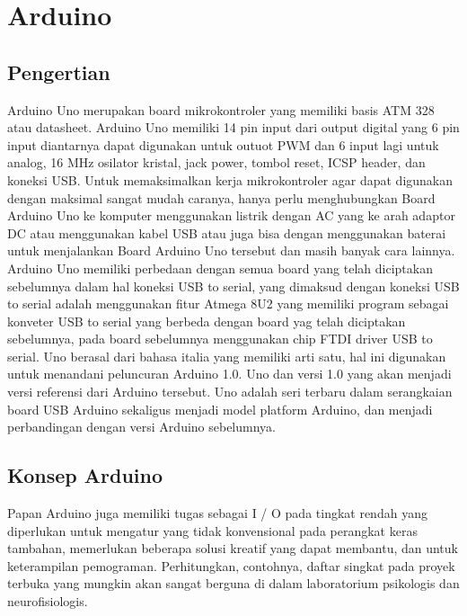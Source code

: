 \section{Arduino}
\subsection{Pengertian}
Arduino Uno merupakan board mikrokontroler yang memiliki basis ATM 328 atau datasheet. Arduino Uno memiliki 14 pin input dari output digital yang 6 pin input diantarnya dapat digunakan untuk outuot PWM dan 6 input lagi untuk analog, 16 MHz osilator kristal, jack power, tombol reset, ICSP header, dan koneksi USB. Untuk memaksimalkan kerja mikrokontroler agar dapat digunakan dengan maksimal sangat mudah caranya, hanya perlu menghubungkan Board Arduino Uno ke komputer menggunakan listrik dengan  AC yang ke arah  adaptor DC atau menggunakan kabel USB atau  juga bisa dengan menggunakan baterai untuk menjalankan Board Arduino Uno tersebut dan masih banyak cara lainnya.
Arduino Uno memiliki perbedaan dengan semua board yang telah diciptakan sebelumnya dalam hal koneksi USB to serial, yang dimaksud dengan koneksi USB to serial adalah menggunakan fitur Atmega 8U2 yang memiliki program sebagai konveter USB to serial yang berbeda dengan board yag telah diciptakan sebelumnya, pada board sebelumnya menggunakan chip FTDI driver USB to serial.
Uno berasal dari bahasa italia yang memiliki arti satu, hal ini digunakan untuk menandani peluncuran Arduino 1.0. Uno dan versi 1.0 yang akan menjadi versi referensi dari Arduino tersebut. Uno adalah seri terbaru dalam serangkaian board USB Arduino sekaligus menjadi model platform Arduino, dan menjadi perbandingan dengan versi Arduino sebelumnya.
\subsection{Konsep Arduino}
Papan Arduino juga memiliki tugas sebagai I / O pada tingkat rendah yang diperlukan untuk mengatur yang tidak konvensional  pada perangkat keras tambahan, memerlukan beberapa solusi kreatif yang dapat membantu, dan untuk keterampilan pemograman. Perhitungkan, contohnya, daftar singkat pada proyek terbuka yang mungkin akan sangat berguna di dalam laboratorium psikologis dan neurofisiologis. 